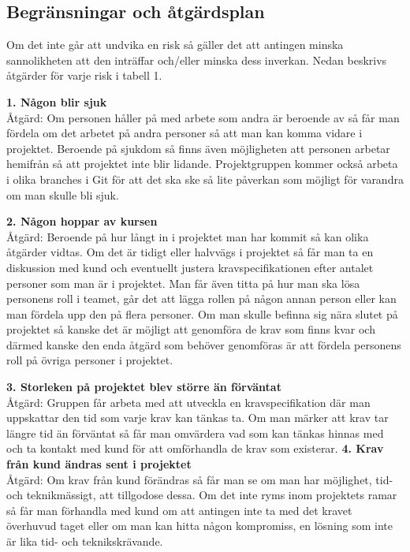 \documentclass[a4paper,10pt]{article}
\begin{document}
\subsection{Begränsningar och åtgärdsplan}
Om det inte går att undvika en risk så gäller det att antingen minska sannolikheten att den inträffar och/eller minska dess inverkan. Nedan beskrivs åtgärder för varje risk i tabell 1.

\textbf{1. Någon blir sjuk}\\
Åtgärd: Om personen håller på med arbete som andra är beroende av så får man fördela om det arbetet på andra personer så att man kan komma vidare i projektet. Beroende på sjukdom så finns även möjligheten att personen arbetar hemifrån så att projektet inte blir lidande. Projektgruppen kommer också arbeta i olika branches i Git för att det ska ske så lite påverkan som möjligt för varandra om man skulle bli sjuk.

\textbf{2. Någon hoppar av kursen}\\
Åtgärd: Beroende på hur långt in i projektet man har kommit så kan olika åtgärder vidtas. Om det är tidigt eller halvvägs i projektet så får man ta en diskussion med kund och eventuellt justera kravspecifikationen efter antalet personer som man är i projektet. Man får även titta på hur man ska lösa personens roll i teamet, går det att lägga rollen på någon annan person eller kan man fördela upp den på flera personer.
Om man skulle befinna sig nära slutet på projektet så kanske det är möjligt att genomföra de krav som finns kvar och därmed kanske den enda åtgärd som behöver genomföras är att fördela personens roll på övriga personer i projektet.

\textbf{3. Storleken på projektet blev större än förväntat}\\
Åtgärd: Gruppen får arbeta med att utveckla en kravspecifikation där man uppskattar den tid som varje krav kan tänkas ta.
Om man märker att krav tar längre tid än förväntat så får man omvärdera vad som kan tänkas hinnas med och ta kontakt med kund för att omförhandla de krav som existerar.
\textbf{4. Krav från kund ändras sent i projektet}\\
Åtgärd: Om krav från kund förändras så får man se om man har möjlighet, tid- och teknikmässigt, att tillgodose dessa. Om det inte ryms inom projektets ramar så får man förhandla med kund om att antingen inte ta med det kravet överhuvud taget eller om man kan hitta någon kompromiss, en lösning som inte är lika tid- och teknikskrävande.
\end{document}
